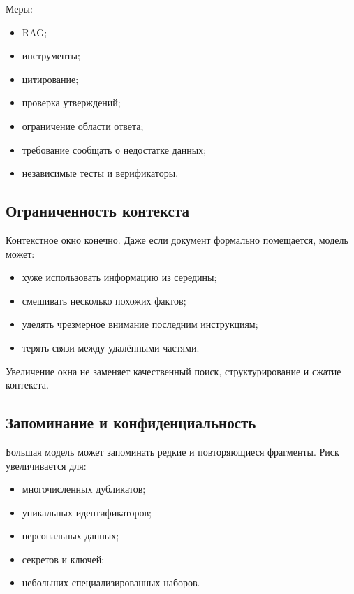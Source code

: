 \documentclass[12pt,a4paper]{article}
\newcommand{\1}{\mathbf{1}}
\theoremstyle{definition}
\theoremstyle{remark}
\begin{document}
Меры:

\begin{itemize}
    \item RAG;
    \item инструменты;
    \item цитирование;
    \item проверка утверждений;
    \item ограничение области ответа;
    \item требование сообщать о недостатке данных;
    \item независимые тесты и верификаторы.
\end{itemize}

\subsection{Ограниченность контекста}

Контекстное окно конечно. Даже если документ формально помещается,
модель может:

\begin{itemize}
    \item хуже использовать информацию из середины;
    \item смешивать несколько похожих фактов;
    \item уделять чрезмерное внимание последним инструкциям;
    \item терять связи между удалёнными частями.
\end{itemize}

Увеличение окна не заменяет качественный поиск, структурирование и
сжатие контекста.

\subsection{Запоминание и конфиденциальность}

Большая модель может запоминать редкие и повторяющиеся фрагменты.
Риск увеличивается для:

\begin{itemize}
    \item многочисленных дубликатов;
    \item уникальных идентификаторов;
    \item персональных данных;
    \item секретов и ключей;
    \item небольших специализированных наборов.
\end{itemize}
\end{document}
